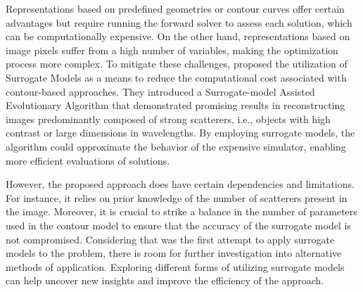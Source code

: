 		
		Representations based on predefined geometries or contour curves offer certain advantages but require running the forward solver to assess each solution, which can be computationally expensive. On the other hand, representations based on image pixels suffer from a high number of variables, making the optimization process more complex. To mitigate these challenges, \cite{salucci2022learned} proposed the utilization of Surrogate Models as a means to reduce the computational cost associated with contour-based approaches. They introduced a Surrogate-model Assisted Evolutionary Algorithm that demonstrated promising results in reconstructing images predominantly composed of strong scatterers, i.e., objects with high contrast or large dimensions in wavelengths. By employing surrogate models, the algorithm could approximate the behavior of the expensive simulator, enabling more efficient evaluations of solutions.
		
		However, the proposed approach does have certain dependencies and limitations. For instance, it relies on prior knowledge of the number of scatterers present in the image. Moreover, it is crucial to strike a balance in the number of parameters used in the contour model to ensure that the accuracy of the surrogate model is not compromised. Considering that \cite{salucci2022learned} was the first attempt to apply surrogate models to the problem, there is room for further investigation into alternative methods of application. Exploring different forms of utilizing surrogate models can help uncover new insights and improve the efficiency of the approach.
		
